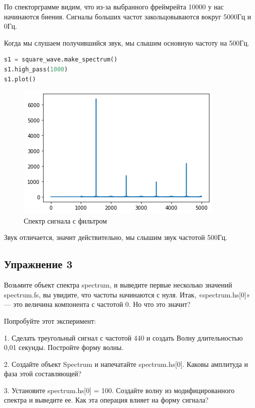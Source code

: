 По спекторграмме видим, что из-за выбранного фреймрейта 10000 у нас начинаются биения. Сигналы больших частот закольцовываются вокруг 5000Гц и 0Гц.

Когда мы слушаем получившийся звук, мы слышим основную частоту на 500Гц.

\begin{lstlisting}[language=Python]
s1 = square_wave.make_spectrum()
s1.high_pass(1000)
s1.plot()
\end{lstlisting}

\begin{figure}[H]
	\begin{center}
		\includegraphics[scale=1]{fig/lab02/lab02_20_0.png}
		\caption{Спектр сигнала с фильтром}
	\end{center}
\end{figure}

Звук отличается, значит действительно, мы слышим звук частотой 500Гц.

\subsection{Упражнение 3}

Возьмите объект спектра spectrum, и выведите первые несколько значений spectrum.fs, вы увидите, что частоты начинаются с нуля. Итак, «spectrum.hs[0]» — это величина компонента с частотой 0. Но что это значит?

\noindent Попробуйте этот эксперимент:

1. Сделать треугольный сигнал с частотой 440 и создать Волну длительностью 0,01 секунды. Постройте форму волны.

2. Создайте объект Spectrum и напечатайте spectrum.hs[0]. Каковы амплитуда и фаза этой составляющей?

3. Установите spectrum.hs[0] = 100. Создайте волну из модифицированного спектра и выведите ее. Как эта операция влияет на форму сигнала?


